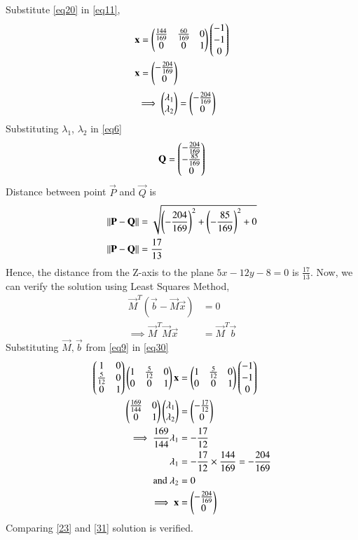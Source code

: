 \documentclass[journal,12pt,twocolumn]{IEEEtran}
\begin{document}
Substitute \eqref{eq20} in \eqref{eq11},
\begin{align}\label{23}
	\mathbf{x} &= \begin{pmatrix}\frac{144}{169} & \frac{60}{169} & 0\\0 & 0 & 1\end{pmatrix}\begin{pmatrix}-1\\-1\\0\end{pmatrix} \\
	\mathbf{x} &= \begin{pmatrix}-\frac{204}{169}\\0\end{pmatrix} 
\end{align}
\begin{align}
	\implies\begin{pmatrix}\lambda_1 \\ \lambda_2\end{pmatrix} &= \begin{pmatrix}-\frac{204}{169}\\0\end{pmatrix}
\end{align}
Substituting $\lambda_1$, $\lambda_2$ in \eqref{eq6}
\begin{equation}
	\mathbf{Q} = \begin{pmatrix}-\frac{204}{169}\\-\frac{85}{169}\\0\end{pmatrix}
\end{equation}
Distance between point $\vec{P}$ and $\vec{Q}$ is
\begin{align}
	\left\lVert\mathbf{P}-\mathbf{Q}\right\rVert &= \sqrt{\left(-\frac{204}{169}\right)^2 +\left(-\frac{85}{169}\right)^2 + 0}\\
	\left\lVert\mathbf{P}-\mathbf{Q}\right\rVert &= \frac{17}{13} 
\end{align}
Hence, the distance from the Z-axis to the plane $5x - 12y - 8 = 0$ is $\frac{17}{13}$. Now, we can verify the solution using Least Squares Method,
\begin{align}
	\vec{M}^T(\vec{b} - \vec{M}\vec{x}) &= 0\\
	\label{eq30}\implies \vec{M}^T\vec{M}\vec{x} &= \vec{M}^T\vec{b}
\end{align}
Substituting $\vec{M}, \vec{b}$ from \eqref{eq9} in \eqref{eq30}
\begin{align}
	\begin{pmatrix}1 & 0\\\frac{5}{12} & 0\\0 & 1\end{pmatrix}\begin{pmatrix}1 & \frac{5}{12} & 0\\0 & 0 & 1\end{pmatrix}\mathbf{x} &= \begin{pmatrix}1 & \frac{5}{12} & 0\\0 & 0 & 1\end{pmatrix}\begin{pmatrix}-1\\-1\\0\end{pmatrix}\\
	\begin{pmatrix}\frac{169}{144} & 0\\0 & 1\end{pmatrix}\begin{pmatrix}\lambda_1\\\lambda_2\end{pmatrix} &= \begin{pmatrix}-\frac{17}{12}\\0\end{pmatrix}\\
	\implies\frac{169}{144}\lambda_1 &= -\frac{17}{12}\\
	\lambda_1 &= -\frac{17}{12} \times \frac{144}{169} = -\frac{204}{169}\\
	\text{and }\lambda_2 &= 0\\
	\label{31}\implies\mathbf{x} &= \begin{pmatrix}-\frac{204}{169}\\0\end{pmatrix}
\end{align}
Comparing \eqref{23} and \eqref{31} solution is verified.
\end{document}
